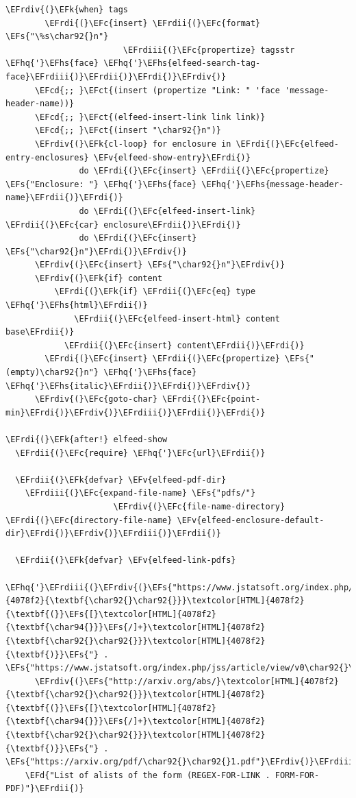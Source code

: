 \documentclass{scrartcl}
\newcommand{\EFk}[1]{\textcolor{EFk}{#1}} %
\newcommand{\EFd}[1]{\textcolor{EFd}{\textit{#1}}} %
\newcommand{\EFs}[1]{\textcolor{EFs}{#1}} %
\newcommand{\EFct}[1]{\textcolor{EFct}{#1}} %
\newcommand{\EFc}[1]{\textcolor{EFc}{#1}} %
\newcommand{\EFv}[1]{\textcolor{EFv}{#1}} %
\newcommand{\EFcd}[1]{\textcolor{EFcd}{#1}} %
\newcommand{\EFhq}[1]{\textcolor{EFhq}{#1}} %
\newcommand{\EFhs}[1]{\textcolor{EFhs}{#1}} %
\newcommand{\EFrdi}[1]{\textcolor{EFrdi}{#1}} %
\newcommand{\EFrdii}[1]{\textcolor{EFrdii}{#1}} %
\newcommand{\EFrdiii}[1]{\textcolor{EFrdiii}{#1}} %
\newcommand{\EFrdiv}[1]{\textcolor{EFrdiv}{#1}} %
\begin{document}
\begin{Code}
\begin{Verbatim}[]
      \EFrdiv{(}\EFk{when} tags
        \EFrdi{(}\EFc{insert} \EFrdii{(}\EFc{format} \EFs{"\%s\char92{}n"}
                        \EFrdiii{(}\EFc{propertize} tagsstr \EFhq{'}\EFhs{face} \EFhq{'}\EFhs{elfeed-search-tag-face}\EFrdiii{)}\EFrdii{)}\EFrdi{)}\EFrdiv{)}
      \EFcd{;; }\EFct{(insert (propertize "Link: " 'face 'message-header-name))}
      \EFcd{;; }\EFct{(elfeed-insert-link link link)}
      \EFcd{;; }\EFct{(insert "\char92{}n")}
      \EFrdiv{(}\EFk{cl-loop} for enclosure in \EFrdi{(}\EFc{elfeed-entry-enclosures} \EFv{elfeed-show-entry}\EFrdi{)}
               do \EFrdi{(}\EFc{insert} \EFrdii{(}\EFc{propertize} \EFs{"Enclosure: "} \EFhq{'}\EFhs{face} \EFhq{'}\EFhs{message-header-name}\EFrdii{)}\EFrdi{)}
               do \EFrdi{(}\EFc{elfeed-insert-link} \EFrdii{(}\EFc{car} enclosure\EFrdii{)}\EFrdi{)}
               do \EFrdi{(}\EFc{insert} \EFs{"\char92{}n"}\EFrdi{)}\EFrdiv{)}
      \EFrdiv{(}\EFc{insert} \EFs{"\char92{}n"}\EFrdiv{)}
      \EFrdiv{(}\EFk{if} content
          \EFrdi{(}\EFk{if} \EFrdii{(}\EFc{eq} type \EFhq{'}\EFhs{html}\EFrdii{)}
              \EFrdii{(}\EFc{elfeed-insert-html} content base\EFrdii{)}
            \EFrdii{(}\EFc{insert} content\EFrdii{)}\EFrdi{)}
        \EFrdi{(}\EFc{insert} \EFrdii{(}\EFc{propertize} \EFs{"(empty)\char92{}n"} \EFhq{'}\EFhs{face} \EFhq{'}\EFhs{italic}\EFrdii{)}\EFrdi{)}\EFrdiv{)}
      \EFrdiv{(}\EFc{goto-char} \EFrdi{(}\EFc{point-min}\EFrdi{)}\EFrdiv{)}\EFrdiii{)}\EFrdii{)}\EFrdi{)}

\EFrdi{(}\EFk{after!} elfeed-show
  \EFrdii{(}\EFc{require} \EFhq{'}\EFc{url}\EFrdii{)}

  \EFrdii{(}\EFk{defvar} \EFv{elfeed-pdf-dir}
    \EFrdiii{(}\EFc{expand-file-name} \EFs{"pdfs/"}
                      \EFrdiv{(}\EFc{file-name-directory} \EFrdi{(}\EFc{directory-file-name} \EFv{elfeed-enclosure-default-dir}\EFrdi{)}\EFrdiv{)}\EFrdiii{)}\EFrdii{)}

  \EFrdii{(}\EFk{defvar} \EFv{elfeed-link-pdfs}
    \EFhq{'}\EFrdiii{(}\EFrdiv{(}\EFs{"https://www.jstatsoft.org/index.php/jss/article/view/v0}\textcolor[HTML]{4078f2}{\textbf{\char92{}\char92{}}}\textcolor[HTML]{4078f2}{\textbf{(}}\EFs{[}\textcolor[HTML]{4078f2}{\textbf{\char94{}}}\EFs{/]+}\textcolor[HTML]{4078f2}{\textbf{\char92{}\char92{}}}\textcolor[HTML]{4078f2}{\textbf{)}}\EFs{"} . \EFs{"https://www.jstatsoft.org/index.php/jss/article/view/v0\char92{}\char92{}1/v\char92{}\char92{}1.pdf"}\EFrdiv{)}
      \EFrdiv{(}\EFs{"http://arxiv.org/abs/}\textcolor[HTML]{4078f2}{\textbf{\char92{}\char92{}}}\textcolor[HTML]{4078f2}{\textbf{(}}\EFs{[}\textcolor[HTML]{4078f2}{\textbf{\char94{}}}\EFs{/]+}\textcolor[HTML]{4078f2}{\textbf{\char92{}\char92{}}}\textcolor[HTML]{4078f2}{\textbf{)}}\EFs{"} . \EFs{"https://arxiv.org/pdf/\char92{}\char92{}1.pdf"}\EFrdiv{)}\EFrdiii{)}
    \EFd{"List of alists of the form (REGEX-FOR-LINK . FORM-FOR-PDF)"}\EFrdii{)}


\end{Verbatim}
\end{Code}
\end{document}
